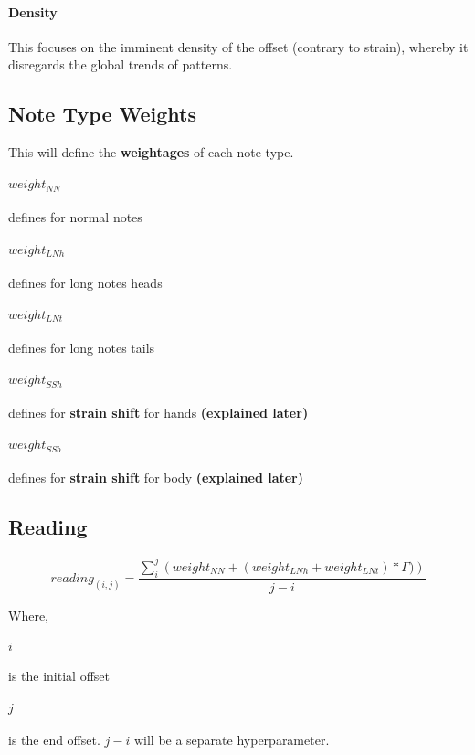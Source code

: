 \documentclass{article}
\begin{document}
\paragraph{Density} This focuses on the imminent density of the offset (contrary to strain), whereby it disregards the global trends of patterns.

\subsection{Note Type Weights}

This will define the \textbf{weightages} of each note type.
\paragraph{$weight_{NN}$} defines for normal notes
\paragraph{$weight_{LNh}$} defines for long notes heads
\paragraph{$weight_{LNt}$} defines for long notes tails
\paragraph{$weight_{SSh}$} defines for \textbf{strain shift} for hands \textbf{(explained later)}
\paragraph{$weight_{SSb}$} defines for \textbf{strain shift} for body \textbf{(explained later)}

\subsection{Reading}

$$ reading_{(i,j)} = \frac{\sum_{i}^{j} \left(weight_{NN} + (weight_{LNh} + weight_{LNt}) * \Gamma) \right)}{j - i}$$

Where,

\paragraph{$i$} is the initial offset
\paragraph{$j$} is the end offset. $j - i$ will be a separate hyperparameter.
\end{document}
